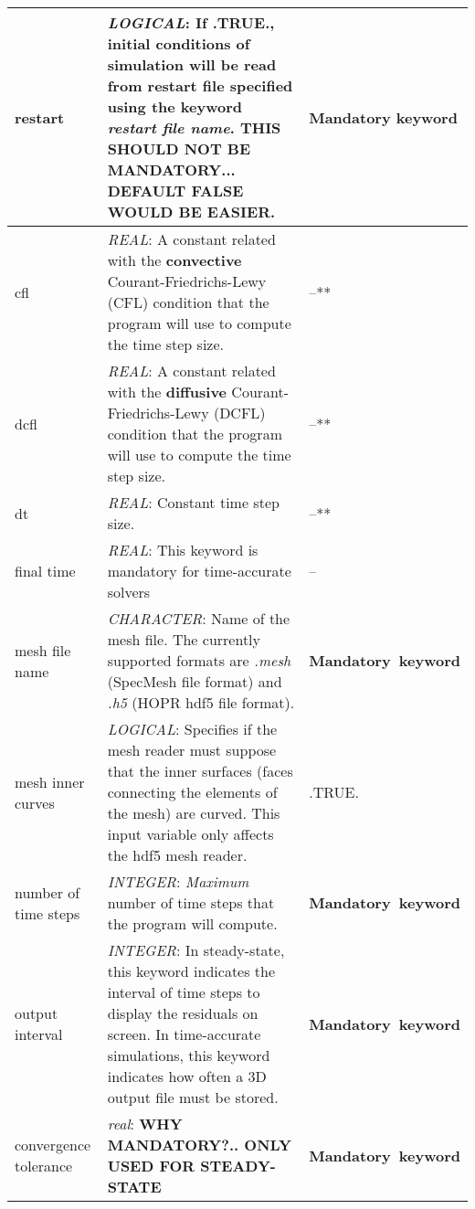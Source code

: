 \documentclass[a4paper,10pt]{report}
\begin{document}
\begin{longtable}{|p{4cm}|p{10cm}|p{2.2cm}|}
restart 			& \textit{LOGICAL}: If .TRUE., initial conditions of simulation will be read from restart file specified using the keyword \textit{restart file name}. \textbf{THIS SHOULD NOT BE MANDATORY... DEFAULT FALSE WOULD BE EASIER}. & \textbf{Mandatory keyword} \\ \hline

cfl & \textit{REAL}: A constant related with the \textbf{convective} Courant-Friedrichs-Lewy (CFL) condition that the program will use to compute the time step size. & --** \\ \hline

dcfl & \textit{REAL}: A constant related with the \textbf{diffusive} Courant-Friedrichs-Lewy (DCFL) condition that the program will use to compute the time step size. & --** \\ \hline

dt  & \textit{REAL}: Constant time step size.  & --** \\ \hline

final time  & \textit{REAL}: This keyword is mandatory for time-accurate solvers & -- \\ \hline

mesh file name & \textit{CHARACTER}: Name of the mesh file. The currently supported formats are \textit{.mesh} (SpecMesh file format) and \textit{.h5} (HOPR hdf5 file format). & \textbf{Mandatory\ keyword} \\ \hline

mesh inner curves & \textit{LOGICAL}: Specifies if the mesh reader must suppose that the inner surfaces (faces connecting the elements of the mesh) are curved. This input variable only affects the hdf5 mesh reader. & .TRUE. \\ \hline

number of time steps & \textit{INTEGER}: \textit{Maximum} number of time steps that the program will compute.  & \textbf{Mandatory\ keyword} \\ \hline

output interval   & \textit{INTEGER}: In steady-state, this keyword indicates the interval of time steps to display the residuals on screen. In time-accurate simulations, this keyword indicates how often a 3D output file must be stored.  & \textbf{Mandatory\ keyword} \\ \hline

convergence tolerance & \textit{real}: \textbf{WHY MANDATORY?.. ONLY USED FOR STEADY-STATE}  & \textbf{Mandatory\ keyword} \\ \hline


\end{longtable}
\end{document}
